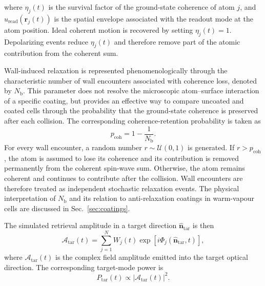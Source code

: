 where $\eta_j(t)$ is the survival factor of the ground-state coherence of atom $j$, and $u_{\mathrm{read}}(\mathbf{r}_j(t))$ is the spatial envelope associated with the readout mode at the atom position. Ideal coherent motion is recovered by setting $\eta_j(t)=1$. Depolarizing events reduce $\eta_j(t)$ and therefore remove part of the atomic contribution from the coherent sum.

Wall-induced relaxation is represented phenomenologically through the characteristic number of wall encounters associated with coherence loss, denoted by $N_{\mathrm b}$. This parameter does not resolve the microscopic atom--surface interaction of a specific coating, but provides an effective way to compare uncoated and coated cells through the probability that the ground-state coherence is preserved after each collision. The corresponding coherence-retention probability is taken as
\begin{equation}
    p_{\mathrm{coh}}
    =
    1-\frac{1}{N_{\mathrm b}}.
    \label{eq:wall_coherence_probability}
\end{equation}
For every wall encounter, a random number $r\sim\mathcal{U}(0,1)$ is generated. If $r>p_{\mathrm{coh}}$, the atom is assumed to lose its coherence and its contribution is removed permanently from the coherent spin-wave sum. Otherwise, the atom remains coherent and continues to contribute after the collision. Wall encounters are therefore treated as independent stochastic relaxation events. The physical interpretation of $N_{\mathrm b}$ and its relation to anti-relaxation coatings in warm-vapour cells are discussed in Sec.~\ref{sec:coatings}.

The simulated retrieval amplitude in a target direction $\hat{\mathbf n}_{\mathrm{tar}}$ is then
\begin{equation}
    \mathcal{A}_{\mathrm{tar}}(t)
    =
    \sum_{j=1}^{N}
    W_j(t)
    \exp\left[
        i\Phi_j(\hat{\mathbf n}_{\mathrm{tar}},t)
    \right],
    \label{eq:target_mode_amplitude}
\end{equation}
where $\mathcal{A}_{\mathrm{tar}}(t)$ is the complex field amplitude emitted into the target optical direction. The corresponding target-mode power is
\begin{equation}
    P_{\mathrm{tar}}(t)
    \propto
    \left|
    \mathcal{A}_{\mathrm{tar}}(t)
    \right|^2 .
    \label{eq:target_mode_power}
\end{equation}

